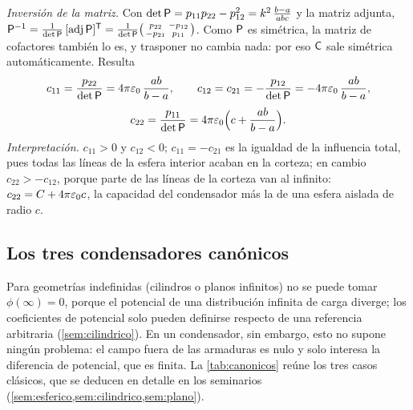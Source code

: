 \begin{ejemplo}
\emph{Inversión de la matriz.} Con $\det\mathsf{P}=p_{11}p_{22}-p_{12}^{2}=k^{2}\,\frac{b-a}{abc}$ y la matriz adjunta,
$\mathsf{P}^{-1}=\frac{1}{\det\mathsf{P}}\,[\operatorname{adj}\mathsf{P}]^{\mathsf{T}}=\frac{1}{\det\mathsf{P}}\bigl(\begin{smallmatrix}p_{22}&-p_{12}\\-p_{21}&p_{11}\end{smallmatrix}\bigr)$. Como $\mathsf{P}$ es simétrica, la
matriz de cofactores también lo es, y trasponer no cambia nada: por eso $\mathsf{C}$ sale simétrica automáticamente. Resulta
\[
  c_{11}=\frac{p_{22}}{\det\mathsf{P}}=4\pi\varepsilon_{0}\,\frac{ab}{b-a},\qquad c_{12}=c_{21}=-\frac{p_{12}}{\det\mathsf{P}}=-4\pi\varepsilon_{0}\,\frac{ab}{b-a},
\]
\[
  c_{22}=\frac{p_{11}}{\det\mathsf{P}}=4\pi\varepsilon_{0}\Bigl(c+\frac{ab}{b-a}\Bigr).
\]
\emph{Interpretación.} $c_{11}>0$ y $c_{12}<0$; $c_{11}=-c_{21}$ es la igualdad de la influencia total, pues todas las líneas de la esfera interior acaban en la
corteza; en cambio $c_{22}>-c_{12}$, porque parte de las líneas de la corteza van al infinito: $c_{22}=C+4\pi\varepsilon_{0} c$, la capacidad del condensador más la de
una esfera aislada de radio $c$.
\end{ejemplo}



\subsection{Los tres condensadores canónicos}\label{sec:canonicos}
Para geometrías indefinidas (cilindros o planos infinitos) no se puede tomar $\phi(\infty)=0$, porque el potencial de una distribución infinita de carga
diverge; los coeficientes de potencial solo pueden definirse respecto de una referencia arbitraria (\cref{sem:cilindrico}). En un condensador, sin
embargo, esto no supone ningún problema: el campo fuera de las armaduras es nulo y solo interesa la diferencia de potencial, que es finita. La
\cref{tab:canonicos} reúne los tres casos clásicos, que se deducen en detalle en los seminarios (\cref{sem:esferico,sem:cilindrico,sem:plano}).

